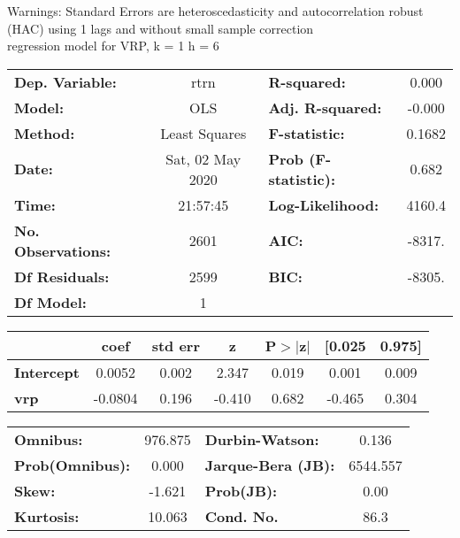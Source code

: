 Warnings: \newline
 [1] Standard Errors are heteroscedasticity and autocorrelation robust (HAC) using 1 lags and without small sample correction\\ 

regression model for VRP, k = 1 h = 6\begin{center}
\begin{tabular}{lclc}
\toprule
\textbf{Dep. Variable:}    &       rtrn       & \textbf{  R-squared:         } &     0.000   \\
\textbf{Model:}            &       OLS        & \textbf{  Adj. R-squared:    } &    -0.000   \\
\textbf{Method:}           &  Least Squares   & \textbf{  F-statistic:       } &    0.1682   \\
\textbf{Date:}             & Sat, 02 May 2020 & \textbf{  Prob (F-statistic):} &    0.682    \\
\textbf{Time:}             &     21:57:45     & \textbf{  Log-Likelihood:    } &    4160.4   \\
\textbf{No. Observations:} &        2601      & \textbf{  AIC:               } &    -8317.   \\
\textbf{Df Residuals:}     &        2599      & \textbf{  BIC:               } &    -8305.   \\
\textbf{Df Model:}         &           1      & \textbf{                     } &             \\
\bottomrule
\end{tabular}
\begin{tabular}{lcccccc}
                   & \textbf{coef} & \textbf{std err} & \textbf{z} & \textbf{P$> |$z$|$} & \textbf{[0.025} & \textbf{0.975]}  \\
\midrule
\textbf{Intercept} &       0.0052  &        0.002     &     2.347  &         0.019        &        0.001    &        0.009     \\
\textbf{vrp}       &      -0.0804  &        0.196     &    -0.410  &         0.682        &       -0.465    &        0.304     \\
\bottomrule
\end{tabular}
\begin{tabular}{lclc}
\textbf{Omnibus:}       & 976.875 & \textbf{  Durbin-Watson:     } &    0.136  \\
\textbf{Prob(Omnibus):} &   0.000 & \textbf{  Jarque-Bera (JB):  } & 6544.557  \\
\textbf{Skew:}          &  -1.621 & \textbf{  Prob(JB):          } &     0.00  \\
\textbf{Kurtosis:}      &  10.063 & \textbf{  Cond. No.          } &     86.3  \\
\bottomrule
\end{tabular}
\end{center}

